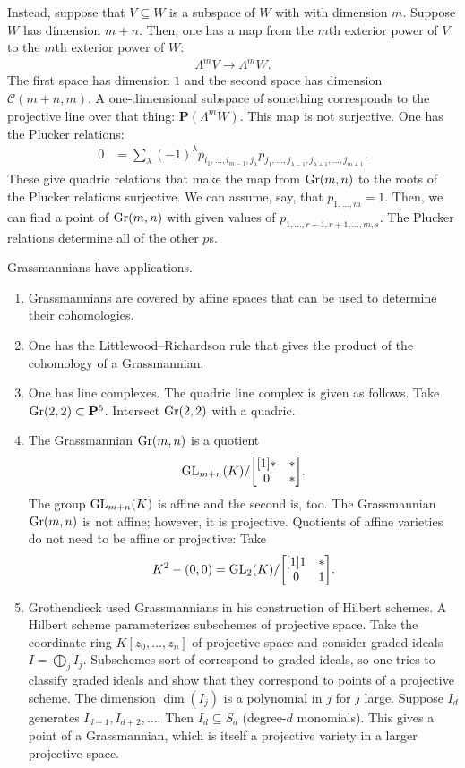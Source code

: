 \documentclass [11 pt, oneside] {article}
\begin{document}
Instead, suppose that $V\subseteq W$ is a subspace of $W$ with with dimension $m$. Suppose $W$ has dimension $m+n$. Then, one has a map from the $m$th exterior power of $V$ to the $m$th exterior power of $W$:
\begin{align*}
	\Lambda^m V \longrightarrow  \Lambda ^m W.
\end{align*}
The first space has dimension $1$ and the second space has dimension $\mathscr{C}({m+n},{m})$. A one-dimensional subspace of something corresponds to the projective line over that thing: $\mathbf{P}(\Lambda^m W)$. This map is not surjective. 
One has the Plucker relations:
\begin{align*}
	0 &= \sum_{\lambda}^{} (-1)^\lambda p_{i_1,\hdots, i_{m-1},j_\lambda} p_{j_1,\hdots, j_{\lambda -1},j_{\lambda+1},\hdots, j_{m+1}}.
\end{align*}
These give quadric relations that make the map from $\operatorname{Gr}(m,n)$ to the roots of the Plucker relations surjective. We can assume, say, that $p_{1,\hdots, m} = 1$. Then, we can find a point of $\operatorname{Gr}(m,n)$ with given values of $p_{1,\hdots, r-1,r+1,\hdots, m,s}$. The Plucker relations determine all of the other $p$s.

Grassmannians have applications.
\begin{enumerate}
	\item Grassmannians are covered by affine spaces that can be used to determine their cohomologies.
	\item One has the Littlewood--Richardson rule that gives the product of the cohomology of a Grassmannian.
	\item One has line complexes. The quadric line complex is given as follows. Take $\operatorname{Gr}(2,2)\subset  \mathbf{P}^5$. Intersect $\operatorname{Gr}(2,2)$ with a quadric.
	\item The Grassmannian $\operatorname{Gr}(m,n)$ is a quotient 
		\[
			{\operatorname{GL}_{m+n}(K)}/{\begin{bmatrix} [1] *&*\\0&*\end{bmatrix}}.
		\] 
		The group $\operatorname{GL}_{m+n}(K)$ is affine and the second is, too. The Grassmannian $\operatorname{Gr}(m,n)$ is not affine; however, it is projective. Quotients of affine varieties do not need to be affine or projective: Take 
		\begin{align*}
			K^2 - (0,0) =  {\operatorname{GL}_{2}(K) }/{\begin{bmatrix} [1] 1&*\\0&1\end{bmatrix}}.
		\end{align*}
	\item Grothendieck used Grassmannians in his construction of Hilbert schemes. A Hilbert scheme parameterizes subschemes of projective space. Take the coordinate ring $K[z_0,\hdots, z_n]$ of projective space and consider graded ideals $I = \bigoplus_j I_j$. Subschemes sort of correspond to graded ideals, so one tries to classify graded ideals and show that they correspond to points of a projective scheme. The dimension $\dim (I_j)$ is a polynomial in $j$ for $j$ large. Suppose $I_d$ generates $I_{d+1},I_{d+2},\hdots$. Then $I_d \subseteq S_d$ (degree-$d$ monomials). This gives a point of a Grassmannian, which is itself a projective variety in a larger projective space.
\end{enumerate}
\end{document}
